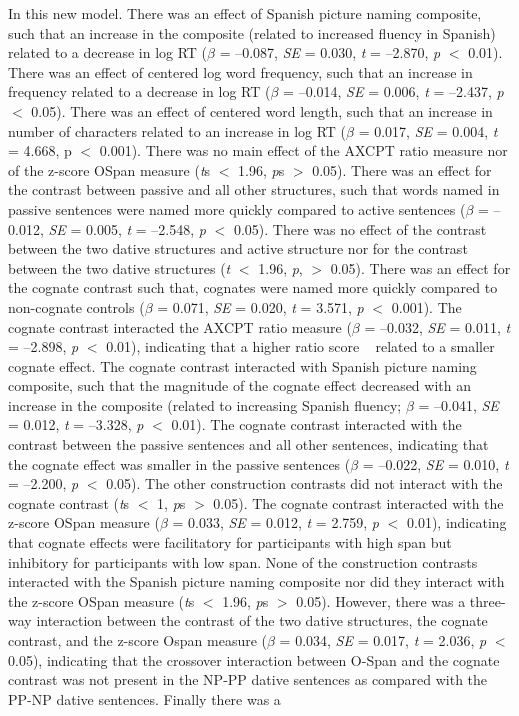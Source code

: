 In this new model. There was an effect of Spanish picture naming composite, such that an increase in the composite (related to increased fluency in Spanish) related to a decrease in log RT (\emph{$\beta$} = --0.087, \emph{SE} = 0.030, \emph{t} = --2.870, \emph{p} $<$ 0.01). There was an effect of centered log word frequency, such that an increase in frequency related to a decrease in log RT (\emph{$\beta$} = --0.014, \emph{SE} = 0.006, \emph{t} = --2.437, \emph{p} $<$ 0.05). There was an effect of centered word length, such that an increase in number of characters related to an increase in log RT ($\beta$ = 0.017, \emph{SE} = 0.004, \emph{t} = 4.668, p $<$ 0.001). There was no main effect of the AXCPT ratio measure nor of the z-score OSpan measure (\emph{t}s $<$ 1.96, \emph{p}s $>$ 0.05). There was an effect for the contrast between passive and all other structures, such that words named in passive sentences were named more quickly compared to active sentences (\emph{$\beta$} = --0.012, \emph{SE} = 0.005, \emph{t} = --2.548, \emph{p} $<$ 0.05). There was no effect of the contrast between the two dative structures and active structure nor for the contrast between the two dative structures (\emph{t} $<$ 1.96, \emph{p}, $>$ 0.05). There was an effect for the cognate contrast such that, cognates were named more quickly compared to non-cognate controls (\emph{$\beta$} = 0.071, \emph{SE} = 0.020, \emph{t} = 3.571, \emph{p} $<$ 0.001). The cognate contrast interacted the AXCPT ratio measure (\emph{$\beta$} = --0.032, \emph{SE} = 0.011, \emph{t} = --2.898, \emph{p} $<$ 0.01), indicating that a higher ratio score  ~\citep[reflective of greater pro-active cognitive control or reliance on contextual information; e.g.,][]{Braver2002} related to a smaller cognate effect. The cognate contrast interacted with Spanish picture naming composite, such that the magnitude of the cognate effect decreased with an increase in the composite (related to increasing Spanish fluency; \emph{$\beta$} = --0.041, \emph{SE} = 0.012, \emph{t} = --3.328, \emph{p} $<$ 0.01). The cognate contrast interacted with the contrast between the passive sentences and all other sentences, indicating that the cognate effect was smaller in the passive sentences (\emph{$\beta$} = --0.022, \emph{SE} = 0.010, \emph{t} = --2.200, \emph{p} $<$ 0.05). The other construction contrasts did not interact with the cognate contrast (\emph{t}s $<$ 1, \emph{p}s $>$ 0.05). The cognate contrast interacted with the z-score OSpan measure (\emph{$\beta$} = 0.033, \emph{SE} = 0.012, \emph{t} = 2.759, \emph{p} $<$ 0.01), indicating that cognate effects were facilitatory for participants with high span but inhibitory for participants with low span. None of the construction contrasts interacted with the Spanish picture naming composite nor did they interact with the z-score OSpan measure (\emph{t}s $<$ 1.96, \emph{p}s $>$ 0.05). However, there was a three-way interaction between the contrast of the two dative structures, the cognate contrast, and the z-score Ospan measure (\emph{$\beta$} = 0.034, \emph{SE} = 0.017, \emph{t} = 2.036, \emph{p} $<$ 0.05), indicating that the crossover interaction between O-Span and the cognate contrast was not present in the NP-PP dative sentences as compared with the PP-NP dative sentences. Finally there was a 